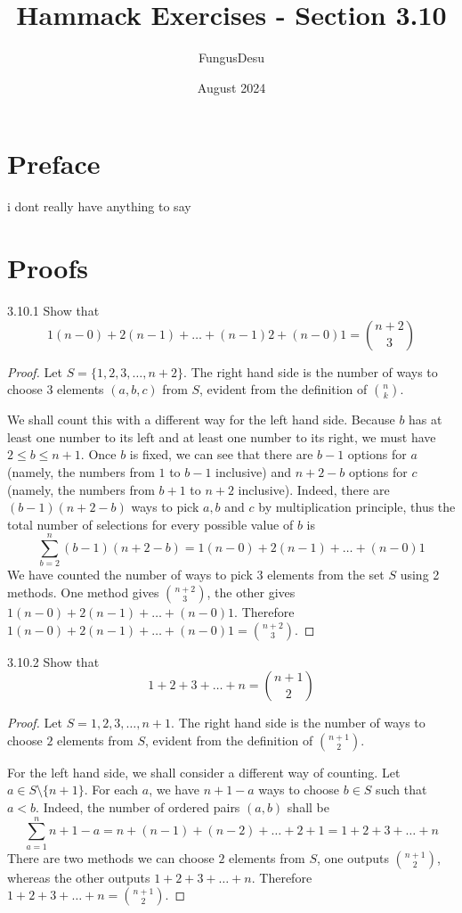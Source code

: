 \documentclass{exam}
\title{Hammack Exercises - Section 3.10}
\author{FungusDesu}
\date{August 2024}
\begin{document}
\maketitle

\section{Preface}
i dont really have anything to say

\section{Proofs}
\begin{problem}{3.10.1}
    Show that $$1(n-0) + 2(n-1) + \dots+(n-1)2 + (n-0)1 = \binom{n+2}{3}$$
\end{problem}

\begin{proof}
    Let $S = \{1, 2, 3, \dots,n+2\}$. The right hand side is the number of ways to choose 3 elements $(a, b, c)$ from $S$, evident from the definition of $\binom n k$.

    We shall count this with a different way for the left hand side. Because $b$ has at least one number to its left and at least one number to its right, we must have $2 \le b \le n+1$. Once $b$ is fixed, we can see that there are $b-1$ options for $a$ (namely, the numbers from $1$ to $b-1$ inclusive) and $n+2-b$ options for $c$ (namely, the numbers from $b+1$ to $n+2$ inclusive). Indeed, there are $(b-1)(n+2-b)$ ways to pick $a, b$ and $c$ by multiplication principle, thus the total number of selections for every possible value of $b$ is \[
    \sum_{b=2}^{n} (b-1)(n+2-b) = 1(n-0) + 2(n-1) +  \dots + (n-0)1
    \]
    We have counted the number of ways to pick 3 elements from the set $S$ using 2 methods. One method gives $\binom{n+2}{3}$, the other gives $1(n-0) + 2(n-1) +  \dots + (n-0)1$. Therefore $1(n-0) + 2(n-1) +  \dots + (n-0)1 = \binom{n+2}{3}$.
\end{proof}

\begin{problem}{3.10.2}
    Show that $$1 + 2 + 3 +  \dots + n = \binom{n+1}2$$
\end{problem}

\begin{proof}
    Let $S = {1, 2, 3,  \dots, n+1}$. The right hand side is the number of ways to choose $2$ elements from $S$, evident from the definition of $\binom{n+1}2$.
    
    For the left hand side, we shall consider a different way of counting. Let $a \in S \setminus \{n+1\}$. For each $a$, we have $n+1-a$ ways to choose $b \in S$ such that $a < b$. Indeed, the number of ordered pairs $(a, b)$ shall be \[
        \sum_{a=1}^{n} n+1-a = n + (n-1) + (n-2) +  \dots + 2 + 1 = 1 + 2 + 3 +  \dots + n
    \]
    There are two methods we can choose $2$ elements from $S$, one outputs $\binom{n+1}2$, whereas the other outputs $1 + 2 + 3 +  \dots + n$. Therefore $1 + 2 + 3 +  \dots + n=\binom{n+1}2$.
\end{proof}
\end{document}
